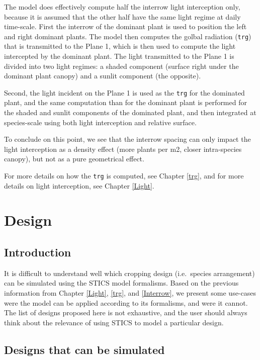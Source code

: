 \documentclass[]{book}
\begin{document}
The model does effectively compute half the interrow light interception only, because it is assumed that the other half have the same light regime at daily time-scale.
First the interrow of the dominant plant is used to position the left and right dominant plants. The model then computes the golbal radiation (\texttt{trg}) that is transmitted to the Plane 1, which is then used to compute the light intercepted by the dominant plant. The light transmitted to the Plane 1 is divided into two light regimes: a shaded component (surface right under the dominant plant canopy) and a sunlit component (the opposite).

Second, the light incident on the Plane 1 is used as the \texttt{trg} for the dominated plant, and the same computation than for the dominant plant is performed for the shaded and sunlit components of the dominated plant, and then integrated at species-scale using both light interception and relative surface.

To conclude on this point, we see that the interrow spacing can only impact the light interception as a density effect (more plants per m2, closer intra-species canopy), but not as a pure geometrical effect.

For more details on how the \texttt{trg} is computed, see Chapter \ref{trg}, and for more details on light interception, see Chapter \ref{Light}.

\hypertarget{design}{%
\chapter{Design}\label{design}}

\hypertarget{introduction-4}{%
\section{Introduction}\label{introduction-4}}

It is difficult to understand well which cropping design (i.e.~species arrangement) can be simulated using the STICS model formalisms. Based on the previous information from Chapter \ref{Light}, \ref{trg}, and \ref{Interrow}, we present some use-cases were the model can be applied according to its formalisms, and were it cannot.
The list of designs proposed here is not exhaustive, and the user should always think about the relevance of using STICS to model a particular design.

\hypertarget{designs-that-can-be-simulated}{%
\section{Designs that can be simulated}\label{designs-that-can-be-simulated}}
\end{document}
